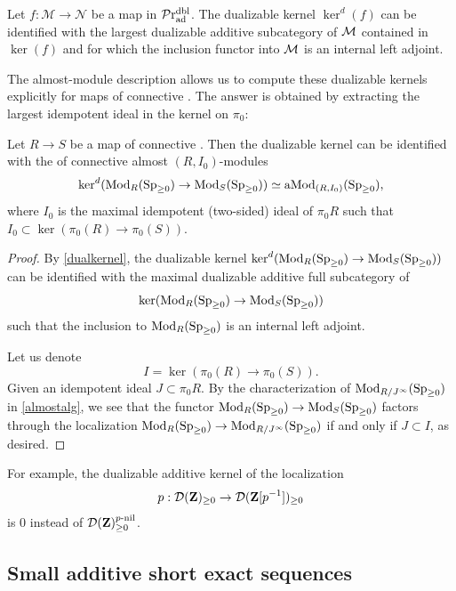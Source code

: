 \documentclass[a4paper,10pt, oneside]{amsart}
\begin{document}
	\begin{cor}\label{dualkernel}
		Let $f: \mathcal{M} \rightarrow \mathcal{N}$ be a map in $\mathcal{P}\mathrm{r}_{\mathrm{ad}}^{\mathrm{dbl}}$. The dualizable kernel $\ker^d(f)$ can be identified with the largest dualizable additive subcategory of $\mathcal{M}$ contained in $\ker(f)$ and for which the inclusion functor into $\mathcal{M}$ is an internal
		left adjoint.
	\end{cor}

	The almost-module description allows us to compute these dualizable kernels explicitly for maps of connective \eonerings. The answer is obtained by extracting the largest idempotent ideal in the kernel on $\pi_0$:
	
	\begin{thm}\label{dualker}
		Let $R\to S$ be a map of connective \eonerings. Then the dualizable kernel can be identified with the \infcat of connective almost $(R,I_0)$-modules $$\ker^d(\operatorname{Mod}_R(\operatorname{Sp}_{\geq0})\to \operatorname{Mod}_S(\operatorname{Sp}_{\geq0}))\simeq \operatorname{aMod}_{(R,I_0)}(\operatorname{Sp}_{\geq0}),$$ where $I_0$ is the maximal idempotent (two-sided) ideal of $\pi_0R$ such that  $I_0\subset \ker(\pi_0(R)\to \pi_0(S))$.
	\end{thm}
	\begin{proof}
		By \cref{dualkernel}, the dualizable kernel $\ker^d(\operatorname{Mod}_R(\operatorname{Sp}_{\geq0})\to \operatorname{Mod}_S(\operatorname{Sp}_{\geq0}))$ can be identified with the maximal dualizable additive full subcategory of $$\ker(\operatorname{Mod}_R(\operatorname{Sp}_{\geq0})\to \operatorname{Mod}_S(\operatorname{Sp}_{\geq0}))$$ such that the inclusion to $\operatorname{Mod}_R(\operatorname{Sp}_{\geq0})$ is an internal left adjoint. 
		
		Let us denote $$I=\ker(\pi_0(R)\to \pi_0(S)).$$ Given an idempotent ideal $J\subset \pi_0R$. By the characterization of $\operatorname{Mod}_{R/J^\infty}(\operatorname{Sp}_{\geq0})$  in \cref{almostalg}, we see that the functor $\operatorname{Mod}_R(\operatorname{Sp}_{\geq0})\to \operatorname{Mod}_S(\operatorname{Sp}_{\geq0})$ factors through the localization $\operatorname{Mod}_R(\operatorname{Sp}_{\geq0})\to \operatorname{Mod}_{R/J^\infty}(\operatorname{Sp}_{\geq0})$ if and only if $J\subset I$, as desired.
	\end{proof}
\begin{exam}
	For example, the dualizable additive kernel of the localization $$p:\mathcal{D}(\mathbf{Z})_{\geq0}\to \mathcal{D}(\mathbf{Z}[p^{-1}])_{\geq0}$$ is $0$ instead of $\mathcal{D}(\mathbf{Z})_{\geq0}^{p\text{-nil}}$.
\end{exam}
\subsection{Small additive short exact sequences}
\end{document}
